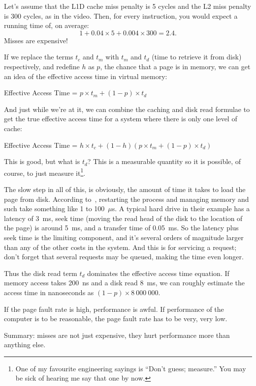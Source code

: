 Let's assume that the L1D cache miss penalty is 5 cycles and the L2 miss penalty is
300 cycles, as in the video. Then, for every instruction, you would expect a running
time of, on average:
\[ 1 + 0.04 \times 5 + 0.004 \times 300 = 2.4. \]
Misses are expensive!


If we replace the terms $t_{c}$ and $t_{m}$ with $t_{m}$ and $t_{d}$ (time to retrieve it from disk) respectively, and redefine $h$ as $p$, the chance that a page is in memory, we can get an idea of the effective access time in virtual memory: 

\begin{center}
	Effective Access Time = $ p \times t_{m} + (1 - p) \times t_{d}$
\end{center}

And just while we're at it, we can combine the caching and disk read formulae to get the true effective access time for a system where there is only one level of cache:

\begin{center}
	Effective Access Time = $ h \times t_{c} + (1 - h) ( p \times t_{m} + (1 - p) \times t_{d})$
\end{center}

This is good, but what is $t_{d}$? This is a measurable quantity so it is possible, of course, to just measure it\footnote{One of my favourite engineering sayings is ``Don't guess; measure.'' You may be sick of hearing me say that one by now.}.

The slow step in all of this, is obviously, the amount of time it takes to load the page from disk. According to~\cite{osc}, restarting the process and managing memory and such take something like 1 to 100~$\mu$s. A typical hard drive in their example has a latency of 3~ms, seek time (moving the read head of the disk to the location of the page) is around 5~ms, and a transfer time of 0.05~ms. So the latency plus seek time is the limiting component, and it's several orders of magnitude larger than any of the other costs in the system. And this is for servicing a request; don't forget that several requests may be queued, making the time even longer.

Thus the disk read term $t_{d}$ dominates the effective access time equation. If memory access takes 200~ns and a disk read 8~ms, we can roughly estimate the access time in nanoseconds as $(1-p) \times 8~000~000$. 

If the page fault rate is high, performance is awful. If performance of the computer is to be reasonable, the page fault rate has to be very, very low.

Summary: misses are not just expensive, they hurt performance more than anything else.





